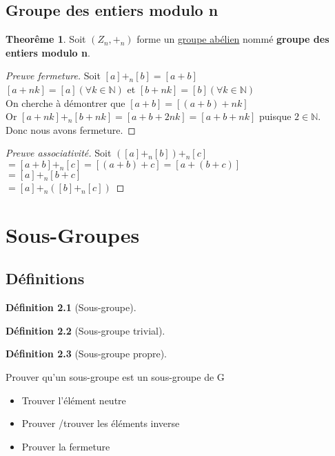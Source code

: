 \documentclass[12pt]{book}
\let\Bbb\mathbb
\def\sep{\phantom{}}
\theoremstyle{definition}
\newtheorem{definition}{Définition}[section]
\newtheorem{theorem}{Theorême}[section]
\begin{document}
\section{Groupe des entiers modulo n}
\begin{theorem}
    \label{thm:groupe_modulo}
    Soit $(Z_n, +_n)$ forme un \hyperref[def:groupe_abelien]{groupe abélien} nommé \textbf{groupe des entiers modulo n}.
\end{theorem}
\begin{proof}[Preuve fermeture]
    Soit $[a] +_n [b] = [a + b]$ \sep \\
    $[a + nk] = [a](\forall k \in \Bbb N)$ et $[b + nk] = [b](\forall k \in \Bbb N)$ \sep \\
    On cherche à démontrer que $[a + b] = [(a + b) + nk]$ \sep \\
    Or $[a + nk] +_n [b + nk] = [a + b + 2nk] = [a + b + nk]$ puisque $2 \in \Bbb N$. \sep \\
    Donc nous avons fermeture.
\end{proof}
\begin{proof}[Preuve associativité]
    Soit $([a] +_n [b]) +_n [c]$ \sep \\
    $= [a + b] +_n [c] = [(a + b) + c] = [a + (b + c)]$ \sep \\
    $= [a] +_n [b + c]$ \sep \\
    $= [a] +_n ([b] + _n [c])$
\end{proof}

\chapter{Sous-Groupes}
\section{Définitions}
\begin{definition}[Sous-groupe]
    \label{def:sous_groupe}
    
\end{definition}

\begin{definition}[Sous-groupe trivial]
    \label{def:sous_groupe_trivial}
    
\end{definition}

\begin{definition}[Sous-groupe propre]
    \label{def:sous_groupe_propre}
    
\end{definition}
Prouver qu'un sous-groupe est un sous-groupe de G
\begin{itemize}
    \item Trouver l'élément neutre
    \item Prouver /trouver les éléments inverse
    \item Prouver la fermeture
\end{itemize}
\end{document}
